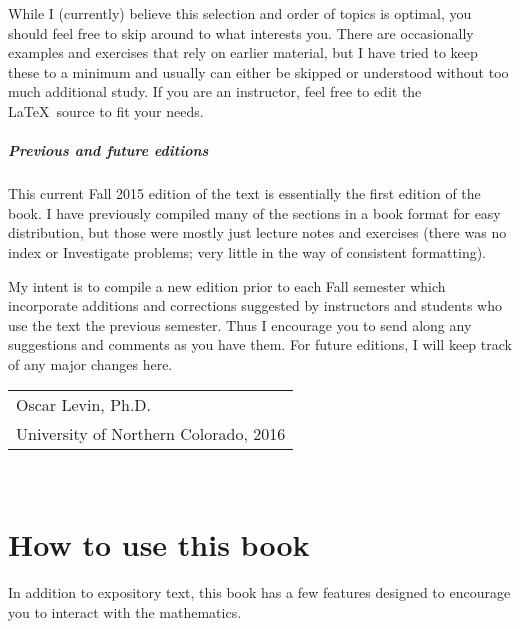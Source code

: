 \documentclass[10pt,]{book}
\theoremstyle{plain}
\theoremstyle{definition}
\theoremstyle{definition}
\theoremstyle{definition}
\numberwithin{equation}{chapter}
\begin{document}
While I (currently) believe this selection and order of topics is optimal, you should feel free to skip around to what interests you. There are occasionally examples and exercises that rely on earlier material, but I have tried to keep these to a minimum and usually can either be skipped or understood without too much additional study. If you are an instructor, feel free to edit the \LaTeX{}~source to fit your needs.
%
\typeout{************************************************}
\typeout{************************************************}
\paragraph[Previous and future editions]{Previous and future editions}\hypertarget{pref_editions}{}

This current Fall 2015 edition of the text is essentially the first edition of the book. I have previously compiled many of the sections in a book format for easy distribution, but those were mostly just lecture notes and exercises (there was no index or Investigate problems; very little in the way of consistent formatting).
%
\par

My intent is to compile a new edition prior to each Fall semester which incorporate additions and corrections suggested by instructors and students who use the text the previous semester. Thus I encourage you to send along any suggestions and comments as you have them. For future editions, I will keep track of any major changes here.
%
\par\hfill\begin{tabular}{l@{}}
Oscar Levin, Ph.D.\\
University of Northern Colorado, 2016
\end{tabular}\\\par
\chapter*{How to use this book}\label{preface-2}

  In addition to expository text, this book has a few features designed to encourage you to interact with the mathematics.
\typeout{************************************************}
\typeout{************************************************}
\end{document}
